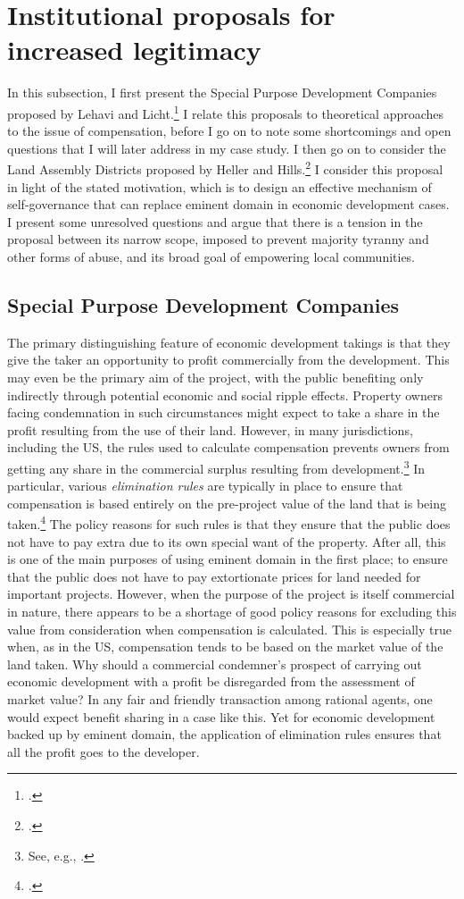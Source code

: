 \section{Institutional proposals for increased legitimacy}\label{subsec:ins}

In this subsection, I first present the Special Purpose Development Companies proposed by Lehavi and Licht.\footcite{lehavi07} I relate this proposals to theoretical approaches to the issue of compensation, before I go on to note some shortcomings and open questions that I will later address in my case study. I then go on to consider the Land Assembly Districts proposed by Heller and Hills.\footcite{heller08} I consider this proposal in light of the stated motivation, which is to design an effective mechanism of self-governance that can replace eminent domain in economic development cases. I present some unresolved questions and argue that there is a tension in the proposal between its narrow scope, imposed to prevent majority tyranny and other forms of abuse, and its broad goal of empowering local communities. 

\subsection{Special Purpose Development Companies}

The primary distinguishing feature of economic development takings is that they give the taker an opportunity to profit commercially from the development. This may even be the primary aim of the project, with the public benefiting only indirectly through potential economic and social ripple effects. Property owners facing condemnation in such circumstances might expect to take a share in the profit resulting from the use of their land. However, in many jurisdictions, including the US, the rules used to calculate compensation prevents owners from getting any share in the commercial surplus resulting from development.\footnote{See, e.g., \cite[965-966]{fennell04}.} In particular, various {\it elimination rules} are typically in place to ensure that compensation is based entirely on the pre-project value of the land that is being taken.\footcite[See][81]{ackerman06} The policy reasons for such rules is that they ensure that the public does not have to pay extra due to its own special want of the property. After all, this is one of the main purposes of using eminent domain in the first place; to ensure that the public does not have to pay extortionate prices for land needed for important projects. However, when the purpose of the project is itself commercial in nature, there appears to be a shortage of good policy reasons for excluding this value from consideration when compensation is calculated. This is especially true when, as in the US, compensation tends to be based on the market value of the land taken. Why should a commercial condemner's prospect of carrying out economic development with a profit be disregarded from the assessment of market value? In any fair and friendly transaction among rational agents, one would expect benefit sharing in a case like this. Yet for economic development backed up by eminent domain, the application of elimination rules ensures that all the profit goes to the developer. 

